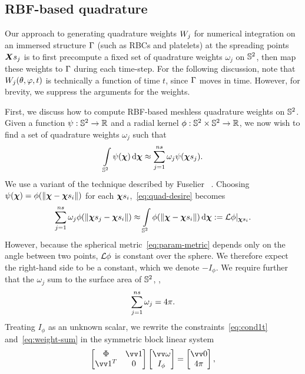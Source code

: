 \subsection{RBF-based quadrature}\label{sec:rbf-quadrature}

Our approach to generating quadrature weights $\weight[j]$ for numerical integration on an immersed structure
$\Gamma$ (such as RBCs and platelets) at the spreading points $\Xsj$ is to first precompute a fixed set of
quadrature weights $\omega_j$ on $\mathbb{S}^2$, then map these weights to $\Gamma$ during each time-step. For the
following discussion, note that $\weight[j](\theta, \varphi, t)$ is technically a function of time $t$, since
$\Gamma$ moves in time. However, for brevity, we suppress the arguments for the weights.

First, we discuss how to compute RBF-based meshless quadrature weights on $\mathbb{S}^2$. Given a function
$\psi:\mathbb{S}^2\to\mathbb{R}$ and a radial kernel $\phi:\mathbb{S}^2\times\mathbb{S}^2\to\mathbb{R}$, we now wish to find a set of quadrature
weights $\omega_j$ such that
\begin{equation}\label{eq:quad-desire}
    \int\limits_{\sphere} \psi(\Xp) \d\Xp \approx \sum_{j=1}^{\sample\cardinality} \omega_j \psi(\Xpsj).
\end{equation}
We use a variant of the technique described by Fuselier ~\cite{Fuselier:2013coba}.  Choosing
$\psi(\Xp) = \phi(\|\Xp-\sample\Xp_i\|)$ for each $\sample\Xp_i$,~\eqref{eq:quad-desire} becomes
\begin{equation}
    \sum_{j=1}^{\sample\cardinality} \omega_j \phi(\|\Xpsj-\sample\Xp_i\|)
    \approx \int\limits_{\sphere}\phi(\|\Xp-\sample\Xp_i\|) \d\Xp := \L\phi|_{\sample\Xp_i}.
    \label{eq:cond1t}
\end{equation}
However, because the spherical metric~\eqref{eq:param-metric} depends only on the angle between two points,
$\mathcal{L}\phi$ is constant over the sphere. We therefore expect the right-hand side to be a constant, which we denote
$-I_\phi$. We require further that the $\omega_j$ sum to the surface area of $\mathbb{S}^2$, ,
\begin{equation}\label{eq:weight-sum}
    \sum_{j=1}^{\sample\cardinality} \omega_j  = 4\pi.
\end{equation}
Treating $I_\phi$ as an unknown scalar, we rewrite the constraints~\eqref{eq:cond1t} and~\eqref{eq:weight-sum} in
the symmetric block linear system
\begin{equation}\label{eq:rbf-quadrature}
    \begin{bmatrix}
            \Phi & \arr{1} \\ \arr{1}^T & 0
    \end{bmatrix}\begin{bmatrix}
            \arr{\omega} \\ I_\phi
    \end{bmatrix} = \begin{bmatrix}
            \arr{0} \\ 4\pi
    \end{bmatrix},
\end{equation}
